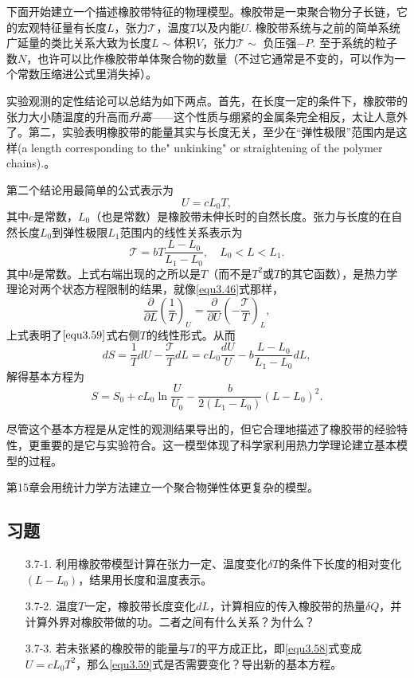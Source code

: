 下面开始建立一个描述橡胶带特征的物理模型。橡胶带是一束聚合物分子长链，它的宏观特征量有长度$L$，张力$\mathscr{T}$，温度$T$以及内能$U$. 橡胶带系统与之前的简单系统广延量的类比关系大致为长度$L \sim $体积$V$，张力$\mathscr{T} \sim$ 负压强$-P$. 至于系统的粒子数$N$，也许可以比作橡胶带单体聚合物的数量（不过它通常是不变的，可以作为一个常数压缩进公式里消失掉）。

实验观测的定性结论可以总结为如下两点。首先，在长度一定的条件下，橡胶带的张力大小随温度的升高而{\it 升高}——这个性质与绷紧的金属条完全相反，太让人意外了。第二，实验表明橡胶带的能量其实与长度无关，至少在“弹性极限”范围内是这样{\color{red}(a length corresponding to the" unkinking" or straightening of the polymer chains).}。

第二个结论用最简单的公式表示为
\begin{equation}
    U = cL_0 T,
\label{equ3.58}
\end{equation}
其中$c$是常数，$L_0$（也是常数）是橡胶带未伸长时的自然长度。张力与长度的在自然长度$L_0$到弹性极限$L_1$范围内的线性关系表示为
\begin{equation}
    \mathscr{T} = bT \frac{L - L_0}{L_1 - L_0}, \quad L_0 < L < L_1.
\label{equ3.59}
\end{equation}
其中$b$是常数。上式右端出现的之所以是$T$（而不是$T^2$或$T$的其它函数），是热力学理论对两个状态方程限制的结果，就像\eqref{equ3.46}式那样，
\begin{equation}
    \frac{\partial}{\partial L} \left( \frac{1}{T} \right)_U = \frac{\partial}{\partial U} \left( -\frac{\mathscr{T}}{T} \right)_L,
\label{equ3.60}
\end{equation}
上式表明了$\eqref{equ3.59}$式右侧$T$的线性形式。从而
\begin{equation}
    dS = \frac{1}{T} dU - \frac{\mathscr{T}}{T} dL = cL_0 \frac{dU}{U} - b \frac{L - L_0}{L_1 - L_0} dL,
\label{equ3.61}
\end{equation}
解得基本方程为
\begin{equation}
    S = S_0 + cL_0 \ln \frac{U}{U_0} - \frac{b}{2(L_1 - L_0)} (L - L_0)^2.
\label{equ3.62}
\end{equation}

尽管这个基本方程是从定性的观测结果导出的，但它合理地描述了橡胶带的经验特性，更重要的是它与实验符合。这一模型体现了科学家利用热力学理论建立基本模型的过程。

第15章会用统计力学方法建立一个聚合物弹性体更复杂的模型。

\subsection*{习题}
\begin{enumerate}
    \item[3.7-1.] 利用橡胶带模型计算在张力一定、温度变化$\delta T$的条件下长度的相对变化$(L - L_0)$，结果用长度和温度表示。
    \item[3.7-2.] 温度$T$一定，橡胶带长度变化$dL$，计算相应的传入橡胶带的热量$\delta Q$，并计算外界对橡胶带做的功。二者之间有什么关系？为什么？
    \item[3.7-3.] 若未张紧的橡胶带的能量与$T$的平方成正比，即\eqref{equ3.58}式变成$U = cL_0 T^2$，那么\eqref{equ3.59}式是否需要变化？导出新的基本方程。
\end{enumerate}

